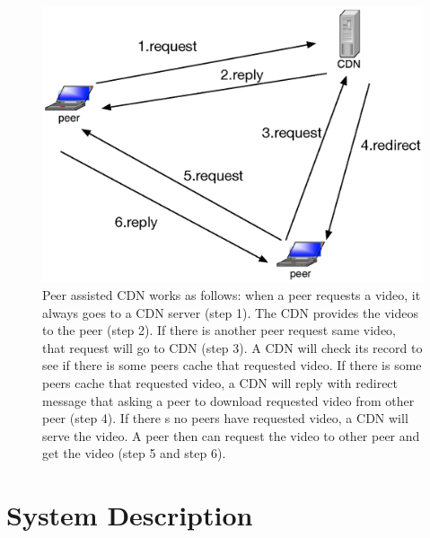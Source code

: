 \documentclass[10pt,final,journal,a4paper]{IEEEtran}
\begin{document}
\begin{figure}[!t]
\begin{center}
\includegraphics[scale=0.4]{graphs/p2p-system-description.eps}
\end{center}
\caption{Peer assisted CDN works as follows:
when a peer requests a video, it always goes to a CDN server (step 1). 
The CDN provides the videos to the peer (step 2). 
If there is another peer request same video, that request will go to CDN (step 3).  
A CDN will check its record to see if there is some peers cache that requested video.  
If there is some peers cache that requested video, a CDN will reply with redirect message that asking a peer to download requested video from other peer (step 4).
If there s no peers have requested video, a CDN will serve the video.   
A peer then can request the video to other peer and get the video (step 5 and step 6).
}
\label{fig:p2pcdninteractioninsimulator}
\end{figure} 



\section{System Description}\label{systemdescription}
\end{document}

